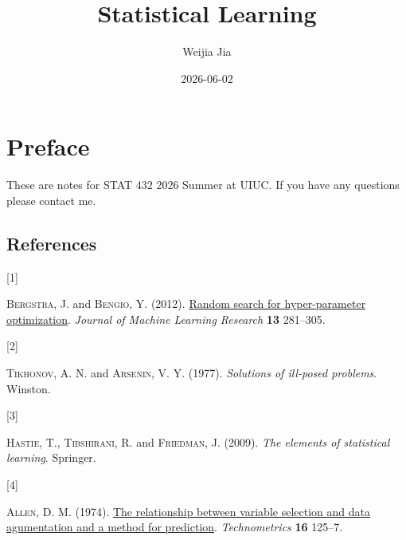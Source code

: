 \documentclass[
  letterpaper,
  DIV=11,
  numbers=noendperiod]{scrreprt}
\title{Statistical Learning}
\author{Weijia Jia}
\date{2026-06-02}
\newlength{\cslhangindent}
\newlength{\csllabelwidth}
\newenvironment{CSLReferences}[2] %
 {\begin{list}{}{%
  \setlength{\itemindent}{0pt}
  \setlength{\leftmargin}{0pt}
  \setlength{\parsep}{0pt}
  \ifodd #1
   \setlength{\leftmargin}{\cslhangindent}
   \setlength{\itemindent}{-1\cslhangindent}
  \fi
  \setlength{\itemsep}{#2\baselineskip}}}
 {\end{list}}
\newcommand{\CSLLeftMargin}[1]{\parbox[t]{\csllabelwidth}{\strut#1\strut}}
\newcommand{\CSLRightInline}[1]{\parbox[t]{\linewidth - \csllabelwidth}{\strut#1\strut}}
\renewcommand*\contentsname{Table of contents}
\newcommand\contentsname{Table of contents}
\theoremstyle{definition}
\theoremstyle{definition}
\theoremstyle{plain}
\theoremstyle{plain}
\theoremstyle{remark}
\begin{document}
\maketitle

\renewcommand*\contentsname{Table of contents}
{
\setcounter{tocdepth}{2}
\tableofcontents
}


\chapter*{Preface}\label{preface}


These are notes for STAT 432 2026 Summer at UIUC. If you have any
questions please contact me.

\section*{References}\label{references}


\protect{}\label{refs}
\begin{CSLReferences}{0}{1}
\CSLLeftMargin{{[}1{]} }%
\CSLRightInline{\textsc{Bergstra}, J. and \textsc{Bengio}, Y. (2012).
\href{http://jmlr.org/papers/v13/bergstra12a.html}{Random search for
hyper-parameter optimization}. \emph{Journal of Machine Learning
Research} \textbf{13} 281--305.}

\CSLLeftMargin{{[}2{]} }%
\CSLRightInline{\textsc{Tikhonov}, A. N. and \textsc{Arsenin}, V. Y.
(1977). \emph{Solutions of ill-posed problems}. Winston.}

\CSLLeftMargin{{[}3{]} }%
\CSLRightInline{\textsc{Hastie}, T., \textsc{Tibshirani}, R. and
\textsc{Friedman}, J. (2009). \emph{The elements of statistical
learning}. Springer.}

\CSLLeftMargin{{[}4{]} }%
\CSLRightInline{\textsc{Allen}, D. M. (1974).
\href{https://doi.org/10.1080/00401706.1974.10489157}{The relationship
between variable selection and data agumentation and a method for
prediction}. \emph{Technometrics} \textbf{16} 125--7.}

\end{CSLReferences}
\end{document}
